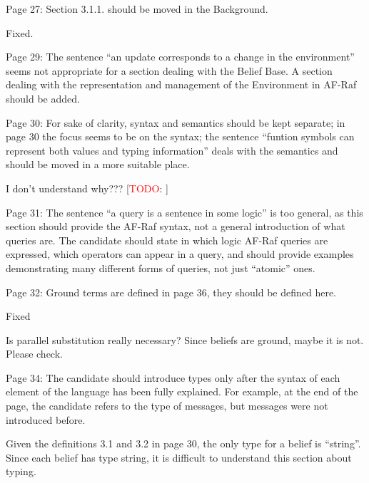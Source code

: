\documentclass{article}
\newcommand{\todo}[1]{[\textcolor{red}{TODO}: #1]}
\newenvironment{them}{\noindent\begingroup\color{blue}}{\endgroup\par}
\begin{document}
\begin{them}
Page 27:
Section 3.1.1. should be moved in the Background.
\end{them}
Fixed. 

\begin{them}
Page 29:
The sentence “an update corresponds to a change in the environment” seems not appropriate for a
section dealing with the Belief Base. A section dealing with the representation and management of
the Environment in AF-Raf should be added.
\end{them}
\todo{}

\begin{them}
Page 30:
For sake of clarity, syntax and semantics should be kept separate; in page 30 the focus seems to be
on the syntax; the sentence “funtion symbols can represent both values and typing information”
deals with the semantics and should be moved in a more suitable place.
\end{them}
I don't understand why???
\todo{}

\begin{them}
Page 31:
The sentence “a query is a sentence in some logic” is too general, as this section should provide the
AF-Raf syntax, not a general introduction of what queries are. The candidate should state in which
logic AF-Raf queries are expressed, which operators can appear in a query, and should provide
examples demonstrating many different forms of queries, not just “atomic” ones.
\end{them}
\todo{}

\begin{them}
Page 32:
Ground terms are defined in page 36, they should be defined here.
\end{them}
Fixed

\begin{them}
Is parallel substitution really necessary? Since beliefs are ground, maybe it is not. Please check.
\end{them}
\todo{}

\begin{them}
Page 34:
The candidate should introduce types only after the syntax of each element of the language has been
fully explained. For example, at the end of the page, the candidate refers to the type of messages,
but messages were not introduced before.
\end{them}
\todo{}

\begin{them}
Given the definitions 3.1 and 3.2 in page 30, the only type for a belief is “string”. Since each belief has
type string, it is difficult to understand this section about typing.
\end{them}
\todo{clarify}
\end{document}
